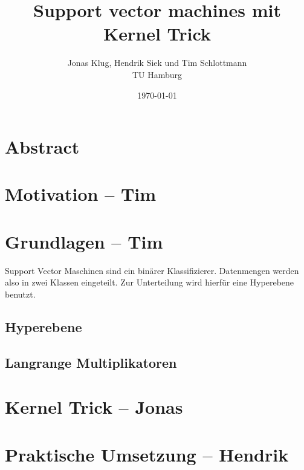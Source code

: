 \documentclass[10pt,a4paper]{scrartcl}
\title{Support vector machines mit Kernel Trick}
\author{Jonas Klug, Hendrik Siek und Tim Schlottmann \\ TU Hamburg }
\date{\today}
\begin{document}
    \maketitle

    \section{Abstract}

    \section{Motivation -- Tim}

    \section{Grundlagen -- Tim}
        Support Vector Maschinen sind ein binärer Klassifizierer. Datenmengen werden also in zwei Klassen eingeteilt. Zur Unterteilung wird hierfür eine Hyperebene benutzt.
        
        \subsection{Hyperebene}

        \subsection{Langrange Multiplikatoren}

    \section{Kernel Trick -- Jonas}

    \section{Praktische Umsetzung -- Hendrik}
\end{document}
